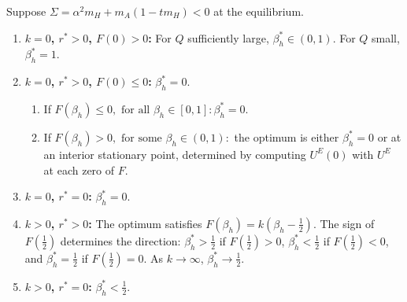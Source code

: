 \documentclass[mnsc,nonblindrev]{informs3_NoOR}
\begin{document}
\begin{proposition}\label{prop:beta-eng}
Suppose $\Sigma = \alpha^2 m_H + m_A(1-tm_H) < 0$ at the equilibrium.
\begin{enumerate}
\item[\textup{(i)}] \textbf{$k=0$, $r^*>0$, $F(0)>0$:} For $Q$ sufficiently large, $\beta_h^* \in (0,1)$. For $Q$ small, $\beta_h^*=1$.
\item[\textup{(ii)}] \textbf{$k=0$, $r^*>0$, $F(0) \leq 0$:} $\beta_h^*=0$.
\begin{enumerate}
    \item If $F(\beta_h) \leq 0, \text{ for all } \beta_h \in [0,1]: \beta_h^*=0$.
    \item If $F(\beta_h) > 0, \text{ for some } \beta_h \in (0,1):$ the optimum is either $\beta^*_h=0$ or at an interior stationary point, determined by computing $U^E(0)$ with $U^E$ at each zero of $F$.
\end{enumerate}
\item[\textup{(iii)}] \textbf{$k=0$, $r^*=0$:} $\beta_h^*=0$.
\item[\textup{(iv)}] \textbf{$k>0$, $r^*>0$:} The optimum satisfies $F(\beta_h)=k(\beta_h-\frac{1}{2})$. The sign of $F(\frac{1}{2})$ determines the direction: $\beta_h^*>\frac{1}{2}$ if $F(\frac{1}{2})>0$, $\beta_h^*<\frac{1}{2}$ if $F(\frac{1}{2})<0$, and $\beta_h^*=\frac{1}{2}$ if $F(\frac{1}{2})=0$. As $k \to \infty$, $\beta_h^* \to \frac{1}{2}$.
\item[\textup{(v)}] \textbf{$k>0$, $r^*=0$:} $\beta_h^*<\frac{1}{2}$.
\end{enumerate}
\end{proposition}



\end{document}
